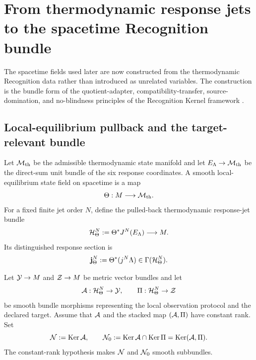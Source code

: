 \section{From thermodynamic response jets to the spacetime Recognition bundle}
\label{sec:thermodynamic-recognition-square}

The spacetime fields used later are now constructed from the thermodynamic Recognition data rather than introduced as unrelated variables.  The construction is the bundle form of the quotient-adapter, compatibility-transfer, source-domination, and no-blindness principles of the Recognition Kernel framework \cite{DabasRKF}.

\subsection{Local-equilibrium pullback and the target-relevant bundle}

Let $\mathcal M_{\mathrm{th}}$ be the admissible thermodynamic state manifold and let $E_\Lambda\to\mathcal M_{\mathrm{th}}$ be the direct-sum unit bundle of the six response coordinates.  A smooth local-equilibrium state field on spacetime is a map
\[
\Theta:M\longrightarrow\mathcal M_{\mathrm{th}}.
\]
For a fixed finite jet order $N$, define the pulled-back thermodynamic response-jet bundle
\begin{equation}
\mathcal H^N_\Theta
:=\Theta^*J^N(E_\Lambda)
\longrightarrow M.
\label{eq:thermodynamic-pullback-jet}
\end{equation}
Its distinguished response section is
\[
\mathbf j^N_\Theta
:=\Theta^*(j^N\Lambda)\in\Gamma(\mathcal H^N_\Theta).
\]

Let $\mathcal Y\to M$ and $\mathcal Z\to M$ be metric vector bundles and let
\[
\mathcal A:\mathcal H^N_\Theta\to\mathcal Y,
\qquad
\Pi:\mathcal H^N_\Theta\to\mathcal Z
\]
be smooth bundle morphisms representing the local observation protocol and the declared target.  Assume that $\mathcal A$ and the stacked map $(\mathcal A,\Pi)$ have constant rank.  Set
\begin{equation}
\mathcal N:=\operatorname{Ker}\mathcal A,
\qquad
\mathcal N_0:=\operatorname{Ker}\mathcal A\cap\operatorname{Ker}\Pi
=\operatorname{Ker}(\mathcal A,\Pi).
\label{eq:bundle-blind-subspaces}
\end{equation}
The constant-rank hypothesis makes $\mathcal N$ and $\mathcal N_0$ smooth subbundles.

